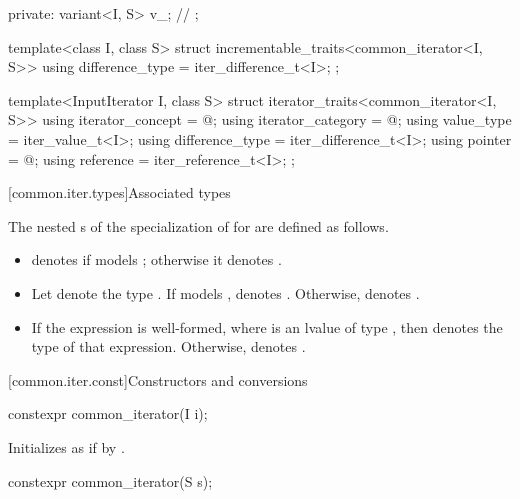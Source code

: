 \begin{addedblock}
\begin{codeblock}
{{  private:
    variant<I, S> v_; // \expos
  };

  template<class I, class S>
  struct incrementable_traits<common_iterator<I, S>> {
    using difference_type = iter_difference_t<I>;
  };

  template<InputIterator I, class S>
  struct iterator_traits<common_iterator<I, S>> {
    using iterator_concept = @\seebelownc@;
    using iterator_category = @\seebelownc@;
    using value_type = iter_value_t<I>;
    using difference_type = iter_difference_t<I>;
    using pointer = @\seebelownc@;
    using reference = iter_reference_t<I>;
  };
}
\end{codeblock}

[common.iter.types]{Associated types}

\pnum
The nested s of the specialization of
 for  are defined as follows.
\begin{itemize}
\item {} denotes 
  if  models ;
  otherwise it denotes .
\item Let  denote the type
  .
  If  models  ,
   denotes .
  Otherwise,
   denotes .
\item If the expression  is well-formed,
  where  is an lvalue of type ,
  then  denotes the type of that expression.
  Otherwise,  denotes .
\end{itemize}

[common.iter.const]{Constructors and conversions}

%
\begin{itemdecl}
constexpr common_iterator(I i);
\end{itemdecl}

\begin{itemdescr}
\pnum
\effects
Initializes  as if by .
\end{itemdescr}

%
\begin{itemdecl}
constexpr common_iterator(S s);
\end{itemdecl}


\end{addedblock}
